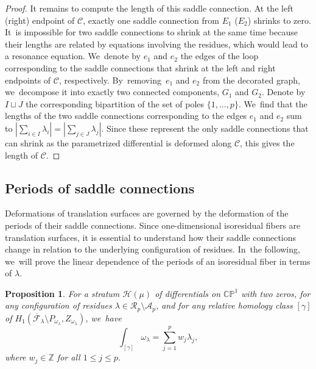\documentclass[JEP,XML,SOM,Unicode,NoFloatCountersInSection,published]{cedram}
\newtheorem{prop}[thm]{Proposition}
\theoremstyle{definition}
\begin{document}
\begin{proof}
It remains to compute the length of this saddle connection. At the left (\resp right) endpoint of $\mathcal{C}$, exactly one saddle connection from $E_{1}$ (\resp $E_{2}$) shrinks to zero. It~is impossible for two saddle connections to shrink at the same time because their lengths are related by equations involving the residues, which would lead to a resonance equation. We~denote by $e_{1}$ and $e_{2}$ the edges of the loop corresponding to the saddle connections that shrink at the left and right endpoints of $\mathcal{C}$, respectively. By~removing~$e_{1}$ and $e_{2}$ from the decorated graph, we~decompose it into exactly two connected components, $G_{1}$ and $G_{2}$. Denote by $I \sqcup J$ the corresponding bipartition of the set of poles $\lbrace{ 1,\dots,p \rbrace}$. We~find that the lengths of the two saddle connections corresponding to the edges $e_{1}$ and $e_{2}$ sum to $|\sum_{i \in I} \lambda_{i}|=|\sum_{j \in J} \lambda_{j}|$. Since these represent the only saddle connections that can shrink as the parametrized differential is deformed along $\mathcal{C}$, this gives the length of $\mathcal{C}$.
\end{proof}

\subsection{Periods of saddle connections}

Deformations of translation surfaces are governed by the deformation of the periods of their saddle connections. Since one-dimensional isoresidual fibers are translation surfaces, it is essential to understand how their saddle connections change in relation to the underlying configuration of residues. In~the following, we~will prove the linear dependence of the periods of an isoresidual fiber in terms of $\lambda$.

\begin{prop}\label{prop:IntegerWeights}
For a stratum $\mathcal{H}(\mu)$ of differentials on $\mathbb{C}\mathbb{P}^1$ with two zeros, for any configuration of residues $\lambda \in \mathcal{R}_{p} \setminus \mathcal{A}_{p}$, and for any relative homology class $[\gamma]$ of $H_{1}(\overline{\mathcal{F}}_{\lambda} \setminus P_{\omega_{\lambda}}, Z_{\omega_{\lambda}})$, we~have\vspace*{-5pt}
\[
\int_{[\gamma]} \omega_{\lambda} = \sum_{j=1}^{p} w_{j}\lambda_{j},
\]
where $w_{j} \in \mathbb{Z}$ for all $1 \leq j \leq p$.
\end{prop}
\end{document}
